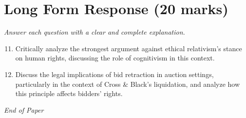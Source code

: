 \documentclass[12pt]{article}
\begin{document}
\section*{Long Form Response (20 marks)}
\textit{Answer each question with a clear and complete explanation.}
\begin{enumerate}[label=\arabic*.]
\setcounter{enumi}{10}
\item Critically analyze the strongest argument against ethical relativism's stance on human rights, discussing the role of cognitivism in this context.
\item Discuss the legal implications of bid retraction in auction settings, particularly in the context of Cross \& Black's liquidation, and analyze how this principle affects bidders' rights.
\end{enumerate}

\vfill
\noindent\textit{End of Paper}
\end{document}
